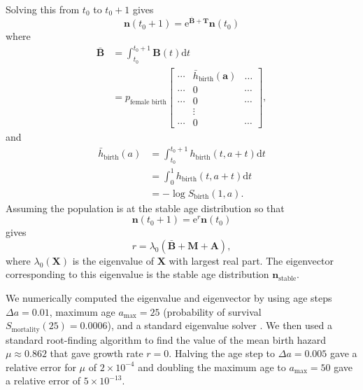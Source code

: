 \documentclass[12pt]{article}
\renewcommand{\vec}[1]{\mathbf{#1}}
\newcommand{\mat}[1]{\mathbf{#1}}
\newcommand{\md}{\mathrm{d}}
\newcommand{\me}{\mathrm{e}}
\begin{document}
Solving this from $t_0$ to $t_0 + 1$ gives
\begin{equation}
  \vec{n}(t_0 + 1)
  = \me^{\bar{\mat{B}} + \mat{T}} \vec{n}(t_0)
\end{equation}
where
\begin{equation}
  \begin{split}
    \bar{\mat{B}} &=
    \int_{t_0}^{t_0 + 1} \mat{B}(t) \md t\\
    &=
    p_{\text{female birth}}
    \begin{bmatrix}
      \cdots & \bar{h}_{\text{birth}}(\vec{a}) & \dots
      \\
      \cdots & 0 & \cdots
      \\
      \cdots & 0 & \cdots
      \\
      & \vdots &
      \\
      \cdots & 0 & \cdots
    \end{bmatrix},
  \end{split}
\end{equation}
and
\begin{equation}
  \begin{split}
    \bar{h}_{\text{birth}}(a)
    &= \int_{t_0}^{t_0 + 1} h_{\text{birth}}(t, a + t) \md t \\
    &= \int_0^1 h_{\text{birth}}(t, a + t) \md t \\
    &= - \log S_{\text{birth}}(1, a).
  \end{split}
\end{equation}
Assuming the population is at the stable age distribution so that
\begin{equation}
  \vec{n}(t_0 + 1) = \me^r \vec{n}(t_0)
\end{equation}
gives
\begin{equation}
  r = \lambda_0\left(\bar{\mat{B}} + \mat{M} + \mat{A}\right),
\end{equation}
where $\lambda_0(\mat{X})$ is the eigenvalue of $\mat{X}$ with largest
real part.  The eigenvector corresponding to this eigenvalue is the
stable age distribution $\vec{n}_{\text{stable}}$.

We numerically computed the eigenvalue and eigenvector by using age
steps $\Delta a = 0.01$, maximum age $a_{\text{max}} = 25$
(probability of survival $S_{\text{mortality}}(25) = 0.0006$), and a
standard eigenvalue solver
\citep[\texttt{scipy.sparse.linalg.eigs},][]{scipy}.  We then used a
standard root-finding algorithm
\citep[\texttt{scipy.optimize.fsolve},][]{scipy} to find the value of
the mean birth hazard $\mu \approx 0.862$ that gave growth rate
$r = 0$.  Halving the age step to $\Delta a = 0.005$ gave a relative
error for $\mu$ of $2 \times 10^{-4}$ and doubling the maximum age to
$a_{\text{max}} = 50$ gave a relative error of $5 \times 10^{-13}$.




\end{document}
